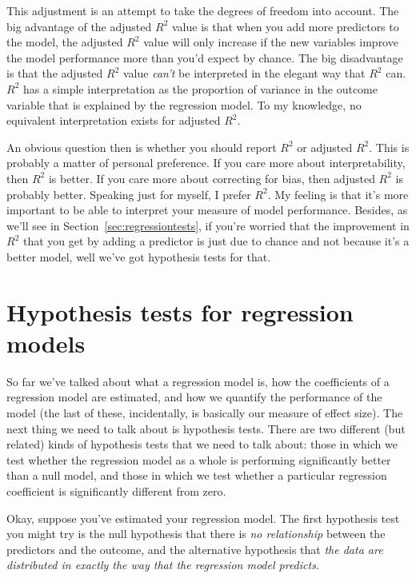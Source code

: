 This adjustment is an attempt to take the degrees of freedom into account. The big advantage of the adjusted $R^2$ value is that when you add more predictors to the model, the adjusted $R^2$ value will only increase if the new variables improve the model performance more than you'd expect by chance. The big disadvantage is that the adjusted $R^2$ value {\it can't} be interpreted in the elegant way that $R^2$ can. $R^2$ has a simple interpretation as the proportion of variance in the outcome variable that is explained by the regression model. To my knowledge, no equivalent interpretation exists for adjusted $R^2$. 

An obvious question then is whether you should report $R^2$ or adjusted $R^2$. This is probably a matter of personal preference. If you care more about interpretability, then $R^2$ is better. If you care more about correcting for bias, then adjusted $R^2$ is probably better. Speaking just for myself, I prefer $R^2$. My feeling is that it's more important to be able to interpret your measure of model performance. Besides, as we'll see in Section~\ref{sec:regressiontests}, if you're worried that the improvement in $R^2$ that you get by adding a predictor is just due to chance and not because it's a better model, well we've got hypothesis tests for that. 


\section{Hypothesis tests for regression models~\label{sec:regressiontests}}

So far we've talked about what a regression model is, how the coefficients of a regression model are estimated, and how we quantify the performance of the model (the last of these, incidentally, is basically our measure of effect size). The next thing we need to talk about is hypothesis tests. There are two different (but related) kinds of hypothesis tests that we need to talk about: those in which we test whether the regression model as a whole is performing significantly better than a null model, and those in which we test whether a particular regression coefficient is significantly different from zero. 
 


Okay, suppose you've estimated your regression model. The first hypothesis test you might try is the null hypothesis that there is {\it no relationship} between the predictors and the outcome, and the alternative hypothesis that {\it the data are distributed in exactly the way that the regression model predicts.} 

